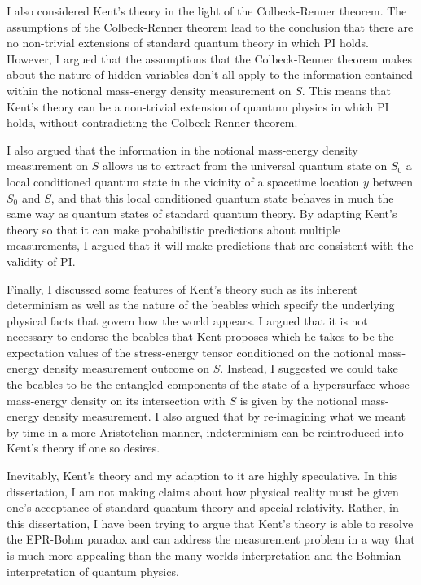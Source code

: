 I also considered Kent's theory in the light of the Colbeck-Renner theorem. The assumptions of the Colbeck-Renner theorem lead to the conclusion that there are no non-trivial extensions of standard quantum theory in which PI holds. However, I argued that the assumptions that the Colbeck-Renner theorem makes about the nature of hidden variables don't all apply to the information contained within the notional mass-energy density measurement on $S$. This means that Kent's theory can be a non-trivial extension of quantum physics in which PI holds, without contradicting the Colbeck-Renner theorem. 

I also argued that the information in the notional mass-energy density measurement on $S$ allows us to extract from the universal quantum state on $S_0$ a local conditioned quantum state in the vicinity of a spacetime location $y$ between $S_0$ and $S$, and that this local conditioned quantum state behaves in much the same way as quantum states of standard quantum theory. By adapting Kent's theory so that it can make probabilistic predictions about multiple measurements, I argued that it will make predictions that are consistent with the validity of PI. 

Finally, I discussed some features of Kent's theory such as its inherent determinism as well as the nature of the beables which specify the underlying physical facts that govern how the world appears. I argued that it is not necessary to endorse the beables that Kent proposes which he takes to be the expectation values of the stress-energy tensor conditioned on the notional mass-energy density measurement outcome on $S$. Instead, I suggested we could take the beables to be the entangled components of the state of a hypersurface whose mass-energy density on its intersection with $S$ is given by the notional mass-energy density measurement. I also argued that by re-imagining what we meant by time in a more Aristotelian manner, indeterminism can be reintroduced into Kent's theory if one so desires. 

Inevitably, Kent's theory and my adaption to it are highly speculative. In this dissertation, I am not making claims about how physical reality must be given one's acceptance of standard quantum theory and special relativity. Rather, in this dissertation, I have been trying to argue that Kent's theory is able to resolve the EPR-Bohm paradox and can address the measurement problem in a way that is much more appealing than the many-worlds interpretation and the Bohmian interpretation of quantum physics.